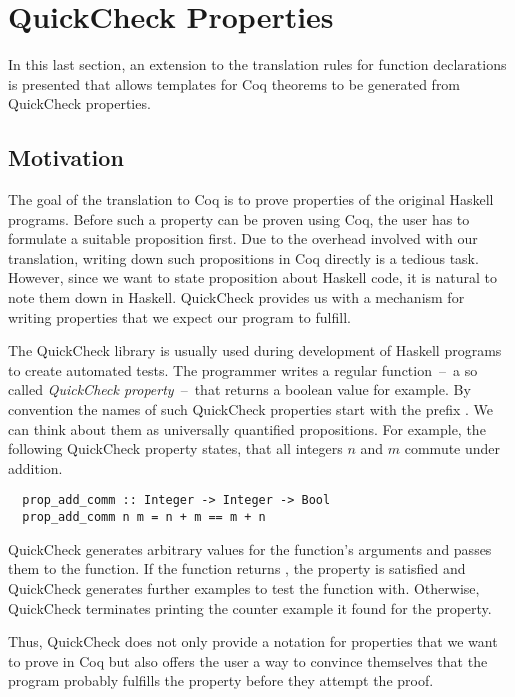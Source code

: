 \section{QuickCheck Properties} \label{sec:translation:func:quickcheck}
In this last section, an extension to the translation rules for function declarations is presented that allows templates for Coq theorems to be generated from QuickCheck properties.

\subsection{Motivation} \label{sec:translation:quickcheck:motivation}
The goal of the translation to Coq is to prove properties of the original Haskell programs.
Before such a property can be proven using Coq, the user has to formulate a suitable proposition first.
Due to the overhead involved with our translation, writing down such propositions in Coq directly is a tedious task.
However, since we want to state proposition about Haskell code, it is natural to note them down in Haskell.
QuickCheck provides us with a mechanism for writing properties that we expect our program to fulfill.

The QuickCheck library is usually used during development of Haskell programs to create automated tests.
The programmer writes a regular function~--~a so called \textit{QuickCheck property}~--~that returns a boolean value for example.
By convention the names of such QuickCheck properties start with the prefix .
We can think about them as universally quantified propositions.
For example, the following QuickCheck property states, that all integers $n$ and $m$ commute under addition.
\begin{verbatim}
  prop_add_comm :: Integer -> Integer -> Bool
  prop_add_comm n m = n + m == m + n
\end{verbatim}
QuickCheck generates arbitrary values for the function's arguments and passes them to the function.
If the function returns , the property is satisfied and QuickCheck generates further examples to test the function with.
Otherwise, QuickCheck terminates printing the counter example it found for the property.

Thus, QuickCheck does not only provide a notation for properties that we want to prove in Coq but also offers the user a way to convince themselves that the program probably fulfills the property before they attempt the proof.

